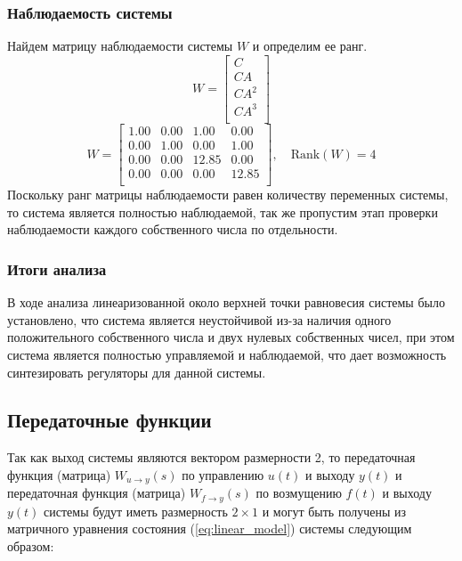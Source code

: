\subsubsection{Наблюдаемость системы}
Найдем матрицу наблюдаемости системы $W$ и определим ее ранг.
\begin{equation}
    W = \begin{bmatrix}
    C \\ 
    CA \\ 
    CA^2 \\ 
    CA^3 \\ 
    \end{bmatrix}
\end{equation}
\begin{equation}
    W = \begin{bmatrix}
    1.00  & 0.00  & 1.00  & 0.00 \\ 
    0.00  & 1.00  & 0.00  & 1.00 \\ 
    0.00  & 0.00  & 12.85  & 0.00 \\ 
    0.00  & 0.00  & 0.00  & 12.85 \\ 
    \end{bmatrix}, \quad \text{Rank}(W) = 4
    \label{eq:observability_matrix}
\end{equation}
Поскольку ранг матрицы наблюдаемости равен количеству переменных системы, то система является полностью наблюдаемой, так же 
пропустим этап проверки наблюдаемости каждого собственного числа по отдельности. 

\subsubsection{Итоги анализа}
В ходе анализа линеаризованной около верхней точки равновесия системы было установлено, что система является
неустойчивой из-за наличия одного положительного собственного числа и двух нулевых собственных чисел, при этом 
система является полностью управляемой и наблюдаемой, что дает возможность синтезировать регуляторы для 
данной системы. 

\subsection{Передаточные функции}
Так как выход системы являются вектором размерности 2, то передаточная функция (матрица) $W_{u\rightarrow y}(s)$ по 
управлению $u(t)$ и выходу $y(t)$ и передаточная функция (матрица) $W_{f\rightarrow y}(s)$ по 
возмущению $f(t)$ и выходу $y(t)$ системы будут иметь размерность $2 \times 1$ и могут быть получены из матричного уравнения состояния
(\ref{eq:linear_model}) системы следующим образом:

